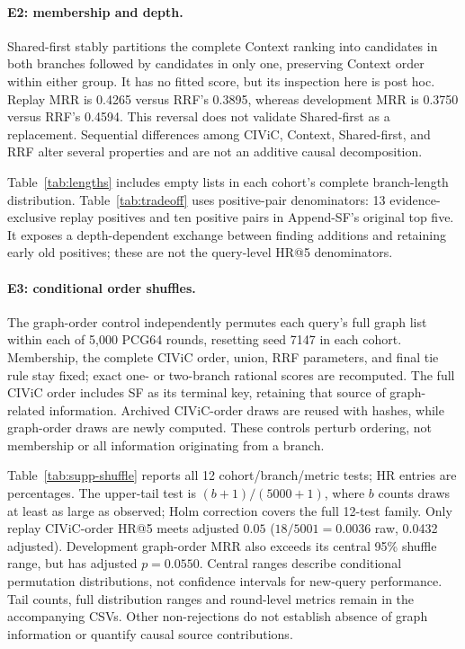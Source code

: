 \documentclass[runningheads]{llncs}
\begin{document}
\paragraph{E2: membership and depth.}
Shared-first stably partitions the complete Context ranking into candidates in both branches followed by candidates in only one, preserving Context order within either group. It has no fitted score, but its inspection here is post hoc. Replay MRR is 0.4265 versus RRF's 0.3895, whereas development MRR is 0.3750 versus RRF's 0.4594. This reversal does not validate Shared-first as a replacement. Sequential differences among CIViC, Context, Shared-first, and RRF alter several properties and are not an additive causal decomposition.

Table~\ref{tab:lengths} includes empty lists in each cohort's complete branch-length distribution. Table~\ref{tab:tradeoff} uses positive-pair denominators: 13 evidence-exclusive replay positives and ten positive pairs in Append-SF's original top five. It exposes a depth-dependent exchange between finding additions and retaining early old positives; these are not the query-level HR@5 denominators.



\paragraph{E3: conditional order shuffles.}
The graph-order control independently permutes each query's full graph list within each of 5,000 PCG64 rounds, resetting seed 7147 in each cohort. Membership, the complete CIViC order, union, RRF parameters, and final tie rule stay fixed; exact one- or two-branch rational scores are recomputed. The full CIViC order includes SF as its terminal key, retaining that source of graph-related information. Archived CIViC-order draws are reused with hashes, while graph-order draws are newly computed. These controls perturb ordering, not membership or all information originating from a branch.

Table~\ref{tab:supp-shuffle} reports all 12 cohort/branch/metric tests; HR entries are percentages. The upper-tail test is \((b+1)/(5000+1)\), where \(b\) counts draws at least as large as observed; Holm correction covers the full 12-test family. Only replay CIViC-order HR@5 meets adjusted \(0.05\) (\(18/5001=0.0036\) raw, 0.0432 adjusted). Development graph-order MRR also exceeds its central 95\% shuffle range, but has adjusted \(p=0.0550\). Central ranges describe conditional permutation distributions, not confidence intervals for new-query performance. Tail counts, full distribution ranges and round-level metrics remain in the accompanying CSVs. Other non-rejections do not establish absence of graph information or quantify causal source contributions.

\end{document}
